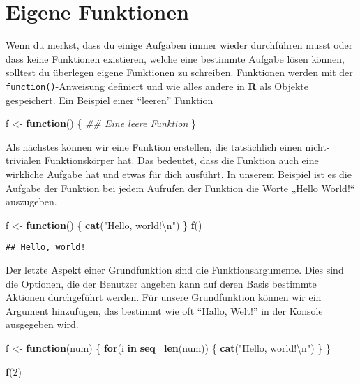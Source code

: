 \documentclass[
]{book}
\newenvironment{Shaded}{\begin{snugshade}}{\end{snugshade}}
\newcommand{\CharTok}[1]{\textcolor[rgb]{0.31,0.60,0.02}{#1}}
\newcommand{\CommentTok}[1]{\textcolor[rgb]{0.56,0.35,0.01}{\textit{#1}}}
\newcommand{\ControlFlowTok}[1]{\textcolor[rgb]{0.13,0.29,0.53}{\textbf{#1}}}
\newcommand{\DecValTok}[1]{\textcolor[rgb]{0.00,0.00,0.81}{#1}}
\newcommand{\KeywordTok}[1]{\textcolor[rgb]{0.13,0.29,0.53}{\textbf{#1}}}
\newcommand{\NormalTok}[1]{#1}
\newcommand{\StringTok}[1]{\textcolor[rgb]{0.31,0.60,0.02}{#1}}
\begin{document}
\hypertarget{eigene-funktionen}{%
\section{Eigene Funktionen}\label{eigene-funktionen}}

Wenn du merkst, dass du einige Aufgaben immer wieder durchführen musst oder dass keine Funktionen existieren, welche eine bestimmte Aufgabe lösen können, solltest du überlegen eigene Funktionen zu schreiben.
Funktionen werden mit der \texttt{function()}-Anweisung definiert und wie alles andere in \textbf{R} als Objekte gespeichert.
Ein Beispiel einer ``leeren'' Funktion

\begin{Shaded}
\begin{Highlighting}[]
\NormalTok{f <-}\StringTok{ }\ControlFlowTok{function}\NormalTok{() \{}
  \CommentTok{## Eine leere Funktion}
\NormalTok{  \}}
\end{Highlighting}
\end{Shaded}

Als nächstes können wir eine Funktion erstellen, die tatsächlich einen nicht-trivialen Funktionskörper hat.
Das bedeutet, dass die Funktion auch eine wirkliche Aufgabe hat und etwas für dich ausführt.
In unserem Beispiel ist es die Aufgabe der Funktion bei jedem Aufrufen der Funktion die Worte „Hello World!{}`` auszugeben.

\begin{Shaded}
\begin{Highlighting}[]
\NormalTok{f <-}\StringTok{ }\ControlFlowTok{function}\NormalTok{() \{}
  \KeywordTok{cat}\NormalTok{(}\StringTok{"Hello, world!}\CharTok{\textbackslash{}n}\StringTok{"}\NormalTok{)}
\NormalTok{\}}
\KeywordTok{f}\NormalTok{()}
\end{Highlighting}
\end{Shaded}

\begin{verbatim}
## Hello, world!
\end{verbatim}

Der letzte Aspekt einer Grundfunktion sind die Funktionsargumente.
Dies sind die Optionen, die der Benutzer angeben kann auf deren Basis bestimmte Aktionen durchgeführt werden.
Für unsere Grundfunktion können wir ein Argument hinzufügen, das bestimmt wie oft ``Hallo, Welt!'' in der Konsole ausgegeben wird.

\begin{Shaded}
\begin{Highlighting}[]
\NormalTok{f <-}\StringTok{ }\ControlFlowTok{function}\NormalTok{(num) \{}
       \ControlFlowTok{for}\NormalTok{(i }\ControlFlowTok{in} \KeywordTok{seq_len}\NormalTok{(num)) \{}
               \KeywordTok{cat}\NormalTok{(}\StringTok{"Hello, world!}\CharTok{\textbackslash{}n}\StringTok{"}\NormalTok{)}
\NormalTok{       \}}
\NormalTok{\}}

\KeywordTok{f}\NormalTok{(}\DecValTok{2}\NormalTok{)}
\end{Highlighting}
\end{Shaded}
\end{document}
